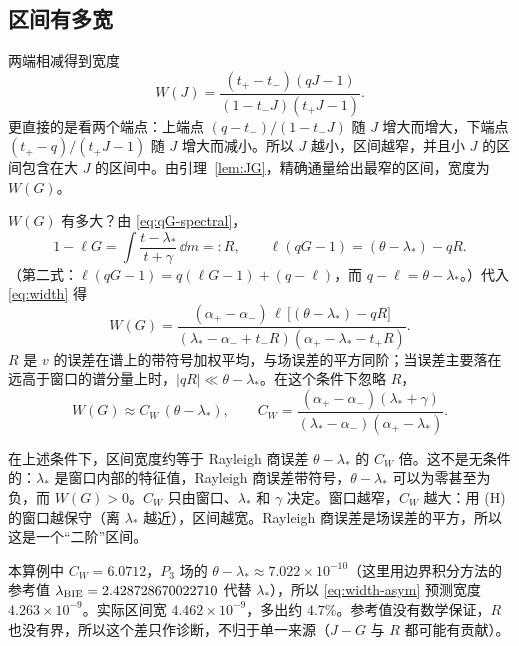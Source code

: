 \documentclass[11pt,a4paper,fontset=fandol]{ctexart}
\begin{document}
\subsection{区间有多宽}

两端相减得到宽度
\begin{equation}
\label{eq:width}
W(J)=\frac{(t_+-t_-)(qJ-1)}{(1-t_-J)(t_+J-1)} .
\end{equation}
更直接的是看两个端点：上端点 $(q-t_-)/(1-t_-J)$ 随 $J$ 增大而增大，下端点 $(t_+-q)/(t_+J-1)$ 随 $J$ 增大而减小。所以 $J$ 越小，区间越窄，并且小 $J$ 的区间包含在大 $J$ 的区间中。由引理~\ref{lem:JG}，精确通量给出最窄的区间，宽度为 $W(G)$。

$W(G)$ 有多大？由 \eqref{eq:qG-spectral}，
\[
1-\ell G=\int\frac{t-\lambda_*}{t+\gamma}\,\dd m=:R ,\qquad
\ell(qG-1)=(\theta-\lambda_*)-qR .
\]
（第二式：$\ell(qG-1)=q(\ell G-1)+(q-\ell)$，而 $q-\ell=\theta-\lambda_*$。）代入 \eqref{eq:width} 得
\begin{equation}
\label{eq:width-exact}
W(G)=\frac{(\alpha_+-\alpha_-)\,\ell\,\bigl[(\theta-\lambda_*)-qR\bigr]}{(\lambda_*-\alpha_-+t_-R)(\alpha_+-\lambda_*-t_+R)} .
\end{equation}
$R$ 是 $v$ 的误差在谱上的带符号加权平均，与场误差的平方同阶；当误差主要落在远高于窗口的谱分量上时，$|qR|\ll\theta-\lambda_*$。在这个条件下忽略 $R$，
\begin{equation}
\label{eq:width-asym}
W(G)\approx C_W\,(\theta-\lambda_*),\qquad C_W=\frac{(\alpha_+-\alpha_-)(\lambda_*+\gamma)}{(\lambda_*-\alpha_-)(\alpha_+-\lambda_*)} .
\end{equation}

\begin{keypoint}
在上述条件下，区间宽度约等于 Rayleigh 商误差 $\theta-\lambda_*$ 的 $C_W$ 倍。这不是无条件的：$\lambda_*$ 是窗口内部的特征值，Rayleigh 商误差带符号，$\theta-\lambda_*$ 可以为零甚至为负，而 $W(G)>0$。$C_W$ 只由窗口、$\lambda_*$ 和 $\gamma$ 决定。窗口越窄，$C_W$ 越大：用 (H) 的窗口越保守（离 $\lambda_*$ 越近），区间越宽。Rayleigh 商误差是场误差的平方，所以这是一个“二阶”区间。
\end{keypoint}

本算例中 $C_W=6.0712$，$P_3$ 场的 $\theta-\lambda_*\approx7.022\times10^{-10}$（这里用边界积分方法的参考值 $\lambda_{\rm BIE}=2.428728670022710$ 代替 $\lambda_*$），所以 \eqref{eq:width-asym} 预测宽度 $4.263\times10^{-9}$。实际区间宽 $4.462\times10^{-9}$，多出约 $4.7\%$。参考值没有数学保证，$R$ 也没有界，所以这个差只作诊断，不归于单一来源（$J-G$ 与 $R$ 都可能有贡献）。
\end{document}
